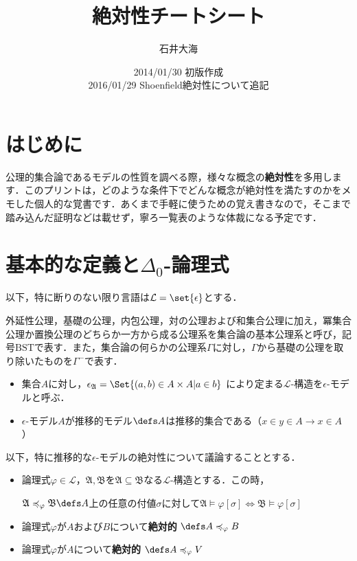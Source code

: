 \documentclass[xelatex,a4j,jadriver=standard]{bxjsarticle}
\title{絶対性チートシート}
\author{石井大海}
\date{2014/01/30 初版作成\\2016/01/29 Shoenfield絶対性について追記}
\newcommand*{\BST}{\mathrm{BST}}
\begin{document}
\maketitle

\section{はじめに}
公理的集合論であるモデルの性質を調べる際，様々な概念の{\bfseries 絶対性}を多用します．このプリントは，どのような条件下でどんな概念が絶対性を満たすのかをメモした個人的な覚書です．あくまで手軽に使うための覚え書きなので，そこまで踏み込んだ証明などは載せず，寧ろ一覧表のような体裁になる予定です．

\section{基本的な定義と$\Delta_0$-論理式}
以下，特に断りのない限り言語は$\mathcal{L} = \set{\epsilon}$とする．

\begin{definition}
 外延性公理，基礎の公理，内包公理，対の公理および和集合公理に加え，冪集合公理か置換公理のどちらか一方から成る公理系を集合論の基本公理系と呼び，記号$\BST$で表す．また，集合論の何らかの公理系$\Gamma$に対し，$\Gamma$から基礎の公理を取り除いたものを$\Gamma^-$で表す．
\end{definition}

\begin{definition}
\begin{itemize}
 \item 集合$A$に対し，$\epsilon_{{\mathfrak{A}}} = \Set{ (a, b) \in A \times A | a \in b}$ により定まる$\mathcal{L}$-構造を$\epsilon$-モデルと呼ぶ．
 \item $\epsilon$-モデル$A$が推移的モデル$\defs A$は推移的集合である（$x \in y \in A \rightarrow x \in A$）
\end{itemize}
\end{definition}

以下，特に推移的な$\epsilon$-モデルの絶対性について議論することとする．

\begin{definition}[絶対性]
 \begin{itemize}
  \item 論理式$\varphi \in \mathcal{L}$，$\mathfrak{A}, \mathfrak{B}$を$\mathfrak{A} \subseteq \mathfrak{B}$なる$\mathcal{L}$-構造とする．この時，
	
	$\mathfrak{A} \preccurlyeq_\varphi \mathfrak{B} \defs A$上の任意の付値$\sigma$に対して$\mathfrak{A} \models \varphi[\sigma] \Leftrightarrow \mathfrak{B} \models \varphi[\sigma]$
  \item 論理式$\varphi$が$A$および$B$について{\bfseries 絶対的} $\defs A \preccurlyeq_\varphi B$
  \item 論理式$\varphi$が$A$について{\bfseries 絶対的} $\defs A \preccurlyeq_\varphi V$
 \end{itemize}
\end{definition}
\end{document}
